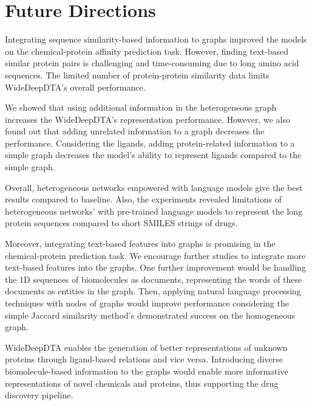 \section{Future Directions}
Integrating sequence similarity-based information to graphs improved the models on the chemical-protein affinity prediction task. However, finding text-based similar protein pairs is challenging and time-consuming due to long amino acid sequences. The limited number of protein-protein similarity data limits WideDeepDTA's overall performance.

We showed that using additional information in the heterogeneous graph increases the WideDeepDTA's representation performance. However, we also found out that adding unrelated information to a graph decreases the performance. Considering the ligands, adding protein-related information to a simple graph decreases the model's ability to represent ligands compared to the simple graph.

Overall, heterogeneous networks empowered with language models give the best results compared to baseline. Also, the experiments revealed limitations of heterogeneous networks' with pre-trained language models to represent the long protein sequences \cite{choromanski2020rethinking} compared to short SMILES strings of drugs. 

Moreover, integrating text-based features into graphs is promising in the chemical-protein prediction task. We encourage further studies to integrate more text-based features into the graphs. One further improvement would be handling the 1D sequences of biomolecules as documents, representing the words of these documents as entities in the graph. Then, applying natural language processing techniques with nodes of graphs would improve performance considering the simple Jaccard similarity method's demonstrated success on the homogeneous graph.

WideDeepDTA enables the generation of better representations of unknown proteins through ligand-based relations and vice versa. Introducing diverse biomolecule-based information to the graphs would enable more informative representations of novel chemicals and proteins, thus supporting the drug discovery pipeline. 


